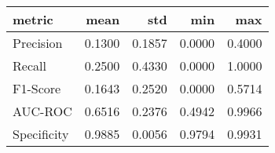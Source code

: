\begin{tabular}{lrrrr}
\toprule
metric & mean & std & min & max \\
\midrule
Precision & 0.1300 & 0.1857 & 0.0000 & 0.4000 \\
Recall & 0.2500 & 0.4330 & 0.0000 & 1.0000 \\
F1-Score & 0.1643 & 0.2520 & 0.0000 & 0.5714 \\
AUC-ROC & 0.6516 & 0.2376 & 0.4942 & 0.9966 \\
Specificity & 0.9885 & 0.0056 & 0.9794 & 0.9931 \\
\bottomrule
\end{tabular}
